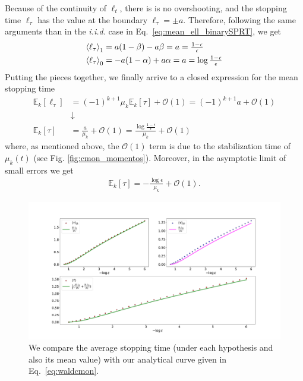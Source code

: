 Because of the continuity of $\ell_{t}$, there is is no overshooting, and the stopping time $\ell_{\tau}$ has the value at the boundary $\ell_{\tau}=\pm a$. Therefore, following the same arguments than in the \textit{i.i.d.} case in Eq.~\eqref{eq:mean_ell_binarySPRT}, we get
\begin{align}
\mathinner{\langle \ell_{\tau}\rangle}_{1} &= a (1-\beta) - a \beta=a=\tfrac{1-\epsilon}{\epsilon}\\
\mathinner{\langle \ell_{\tau}\rangle}_{0} &= -a (1-\alpha)+ a \alpha=a=\log{\tfrac{1-\epsilon}{\epsilon}}
\end{align}
Putting the pieces together, we finally arrive to a closed expression for the mean stopping time
\begin{align}\label{eq:waldcmon}
\mathbb{E}_k[{\ell_\tau}] &= (-1)^{k+1}\mu_k \mathbb{E}_k[\tau]+\mathcal{O}(1)=(-1)^{k+1} a+\mathcal{O}(1) \\
& \downarrow  \nonumber\\
\mathbb{E}_k[\tau]&= \frac{a}{\mu_{k}}+\mathcal{O}(1)=\frac{\log{\tfrac{1-\epsilon}{\epsilon}}}{\mu_{k}}+\mathcal{O}(1) \label{eq:waldcmon3}
\end{align}
where, as mentioned above, the $\mathcal{O}(1)$ term is due to the stabilization time of $\mu_{k}(t)$ (see Fig. \ref{fig:cmon_momentos}). Moreover, in the asymptotic limit of small errors
we get
\begin{align}\label{eq:waldcmon2}
\mathbb{E}_k[\tau]=-\frac{\log{{\epsilon}}}{\mu_{k}}+\mathcal{O}(1).
\end{align}
\begin{figure}[t!]
    \centering
    \includegraphics[width=1.\textwidth]{Figures/CMON/damp-discri/temp/wald_gamma429.pdf}
    \caption{We compare the average stopping time (under each hypothesis and also its mean value) with our analytical curve given in Eq.~\ref{eq:waldcmon}.}
    \label{fig:cmonwald}
\end{figure}

